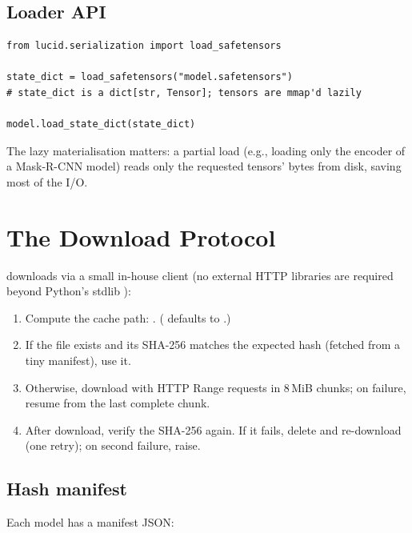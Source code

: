 \subsection{Loader API}
\label{ssec:pretrained:safetensors_loader}

\begin{lstlisting}[style=lucid,language=LucidPython]
from lucid.serialization import load_safetensors

state_dict = load_safetensors("model.safetensors")
# state_dict is a dict[str, Tensor]; tensors are mmap'd lazily

model.load_state_dict(state_dict)
\end{lstlisting}

The lazy materialisation matters: a partial load (e.g., loading
only the encoder of a Mask-R-CNN model) reads only the requested
tensors' bytes from disk, saving most of the I/O.

\section{The Download Protocol}
\label{sec:pretrained:download_protocol}

 downloads via a small in-house client
(no external HTTP libraries are required beyond Python's stdlib
):

\begin{enumerate}
  \item Compute the cache path:
    .
    ( defaults to .)
  \item If the file exists and its SHA-256 matches the
    expected hash (fetched from a tiny manifest), use it.
  \item Otherwise, download with HTTP Range requests in
    8\,MiB chunks; on failure, resume from the last
    complete chunk.
  \item After download, verify the SHA-256 again. If it
    fails, delete and re-download (one retry); on second
    failure, raise.
\end{enumerate}

\subsection{Hash manifest}
\label{ssec:pretrained:hash_manifest}

Each model has a manifest JSON:

